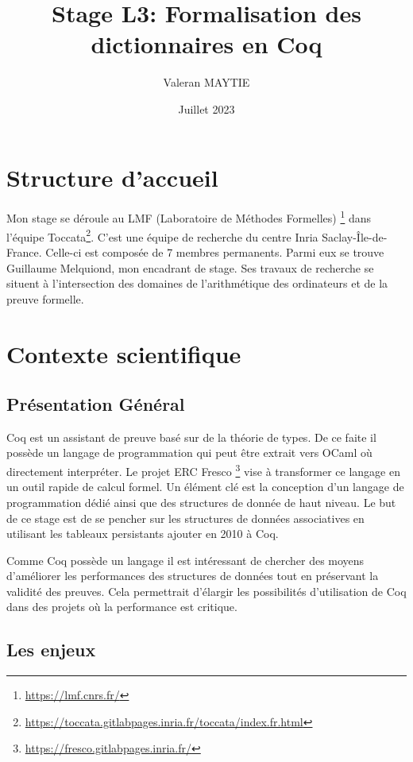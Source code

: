 \documentclass{article}
\title{Stage L3: Formalisation des dictionnaires en Coq}
\author{Valeran MAYTIE}
\date{Juillet 2023}
\begin{document}
  \maketitle

  \section{Structure d'accueil}

  Mon stage se déroule au LMF (Laboratoire de Méthodes Formelles)
\footnote{\url{https://lmf.cnrs.fr/}} dans l'équipe Toccata\footnote{
\url{https://toccata.gitlabpages.inria.fr/toccata/index.fr.html}}. C'est une
équipe de recherche du centre Inria Saclay-Île-de-France. Celle-ci est composée
de 7 membres permanents. Parmi eux se trouve Guillaume Melquiond, mon encadrant
de stage. Ses travaux de recherche se situent à l'intersection des domaines de
l'arithmétique des ordinateurs et de la preuve formelle.

  \section{Contexte scientifique}

    \subsection{Présentation Général}

  Coq est un assistant de preuve basé sur de la théorie de types. De ce faite il
possède un langage de programmation qui peut être extrait vers OCaml où
directement interpréter. Le projet ERC Fresco
\footnote{\url{https://fresco.gitlabpages.inria.fr/}} vise à transformer
ce langage en un outil rapide de calcul formel. Un élément clé est la conception
d'un langage de programmation dédié ainsi que des structures de donnée de haut
niveau. Le but de ce stage est de se pencher sur les structures de données
associatives en utilisant les tableaux persistants ajouter en 2010 à Coq.

  Comme Coq possède un langage il est intéressant de chercher des moyens
d'améliorer les performances des structures de données tout en préservant la
validité des preuves. Cela permettrait d'élargir les possibilités d'utilisation
de Coq dans des projets où la performance est critique.

    \subsection{Les enjeux}
\end{document}
